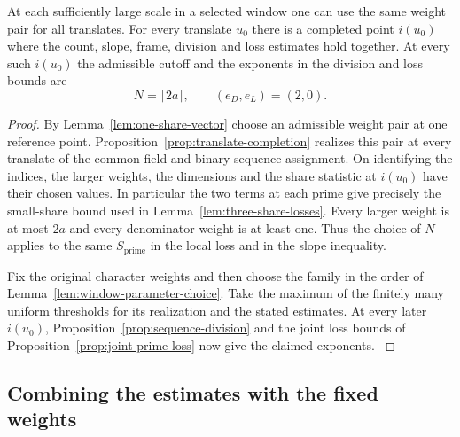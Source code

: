 \begin{proposition}\label{prop:estimates-each-translate}
At each sufficiently large scale in a selected window one can use
the same weight pair for all translates. For every translate
\(u_0\) there is a completed point \(i(u_0)\) where the count,
slope, frame, division and loss estimates hold together.
At every such \(i(u_0)\) the admissible cutoff and the exponents in the division and loss bounds are
\[
 N=\lceil2a\rceil,\qquad(e_D,e_L)=(2,0).
\]

\end{proposition}
\begin{proof}
By Lemma~\ref{lem:one-share-vector} choose an admissible weight pair
at one reference point. Proposition~\ref{prop:translate-completion} realizes
this pair at every translate of the common field and binary sequence
assignment. On identifying the indices, the larger weights, the
dimensions and the share statistic at \(i(u_0)\) have their chosen
values. In particular the two terms at each prime give precisely the
small-share bound used in Lemma~\ref{lem:three-share-losses}.
Every larger weight is at most \(2a\) and every denominator weight
is at least one. Thus the choice of \(N\) applies to the same
\(S_{\mathrm{prime}}\) in the local loss and in the slope inequality.

Fix the original character weights and then choose the family in the
order of Lemma~\ref{lem:window-parameter-choice}. Take the maximum of the
finitely many uniform thresholds for its realization and the stated
estimates. At every later \(i(u_0)\),
Proposition~\ref{prop:sequence-division} and the joint loss bounds of
Proposition~\ref{prop:joint-prime-loss} now give the claimed exponents.
\label{cor:frames-10}
\end{proof}

\subsection{Combining the estimates with the fixed weights}
\label{subsec:fixed-weight-absorption}

